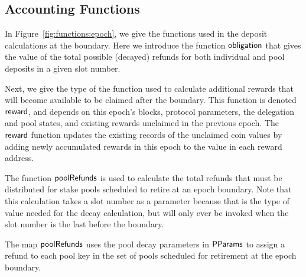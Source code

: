 \subsection{Accounting Functions}
\label{sec:acc-fun}

In Figure~\ref{fig:functions:epoch}, we give the functions used in the deposit
calculations at the boundary. Here we introduce the function $\mathsf{obligation}$
that gives the value of the total possible (decayed) refunds for both individual
and pool deposits in a given slot number.

Next, we give the type of the function used to calculate additional rewards that
will become available to be claimed after the boundary. This function is denoted
$\mathsf{reward}$, and depends on this epoch's blocks, protocol parameters, the
delegation and pool states, and existing rewards unclaimed in the previous
epoch.  The $\mathsf{reward}$ function updates the existing records of the
unclaimed coin values by adding newly accumulated rewards in this epoch to the
value in each reward address.

The function $\mathsf{poolRefunds}$ is used to calculate the total refunds
that must be distributed
for stake pools scheduled to retire at an epoch boundary. Note that this
calculation takes a slot number as a parameter because that is the type of value
needed for the decay calculation, but will only ever be invoked
when the slot number is the last before the boundary.

The map $\mathsf{poolRefunds}$ uses the pool decay parameters in $\mathsf{PParams}$
to assign a refund to each pool key in the set of pools scheduled for retirement
at the epoch boundary.

